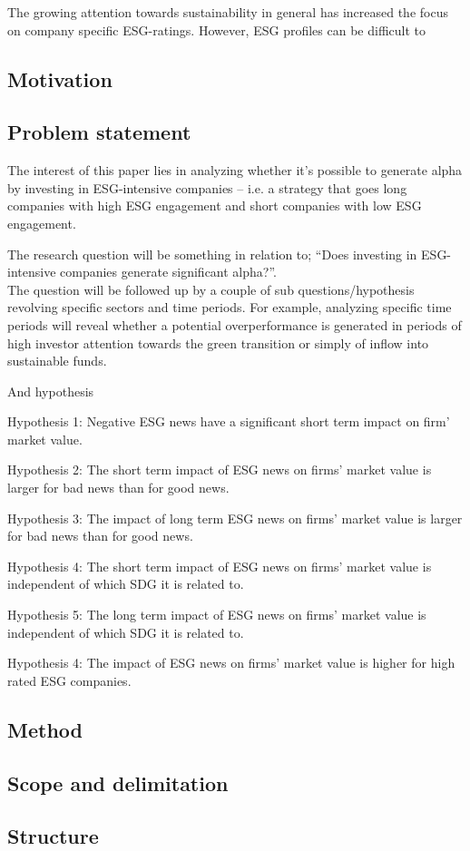 The growing attention towards sustainability in general has increased the focus on company specific ESG-ratings. However, ESG profiles can be difficult to


\subsection{Motivation}

\subsection{Problem statement}

The interest of this paper lies in analyzing whether it’s possible to generate alpha by investing in ESG-intensive companies – i.e.
a strategy that goes long companies with high ESG engagement and short companies with low ESG engagement. 

The research question will be something in relation to; “Does investing in ESG-intensive companies generate significant alpha?”. \\

The question will be followed up by a couple of sub questions/hypothesis revolving specific sectors and time periods. For example, analyzing specific time periods will reveal whether a potential overperformance is generated in periods of high investor attention towards the green transition or simply of inflow into sustainable funds. 

And hypothesis

Hypothesis 1:
Negative ESG news have a significant short term impact on firm' market value.

Hypothesis 2:
The short term impact of ESG news on firms' market value is larger for bad news than for good news. 

Hypothesis 3:
The impact of long term ESG news on firms' market value is larger for bad news than for good news. 

Hypothesis 4: The short term impact of ESG news on firms' market value is independent of which SDG it is related to. 

Hypothesis 5: The long term impact of ESG news on firms' market value is independent of which SDG it is related to.  

Hypothesis 4: The impact of ESG news on firms' market value is higher for high rated ESG companies. 

\subsection{Method}

\subsection{Scope and delimitation}

\subsection{Structure}
